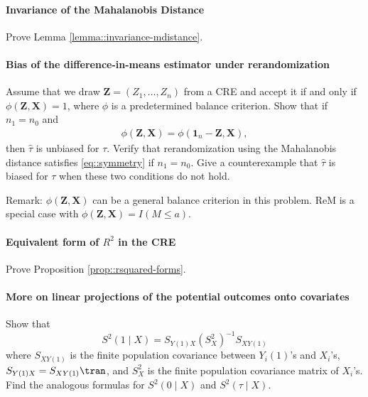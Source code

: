 \paragraph{Invariance of the Mahalanobis Distance}\label{para::invariance-M}

Prove Lemma \ref{lemma::invariance-mdistance}. 


\paragraph{Bias of the difference-in-means estimator under rerandomization}\label{hw::unbiasednessof-tauhat-rerandom}

Assume that we draw $\bm{Z} = (Z_1, \ldots, Z_n)$ from a CRE and accept it if and only if $\phi(\bm{Z}, \bm{X}) = 1$, where $\phi$ is a predetermined balance criterion. Show that if $n_1 = n_0$ and 
\begin{eqnarray}
\phi(\bm{Z}, \bm{X}) = \phi(\bm{1}_n-\bm{Z}, \bm{X}), \label{eq::symmetry}
\end{eqnarray}
then $\hat{\tau}$ is unbiased for $\tau$. 
Verify that rerandomization using the Mahalanobis distance satisfies \eqref{eq::symmetry} if $n_1 = n_0$. 
Give a counterexample that $\hat{\tau}$ is biased for $\tau$ when these two conditions do not hold.  


Remark: $\phi(\bm{Z}, \bm{X}) $ can be a general balance criterion in this problem. ReM is a special case with $\phi(\bm{Z}, \bm{X})  =  I(M\leq a) $.


\paragraph{Equivalent form of $R^2$ in the CRE}\label{para::r2-cre}

Prove Proposition \ref{prop::rsquared-forms}. 



\paragraph{More on linear projections of the potential outcomes onto covariates}\label{hw::projection-po-onto-x}



Show that
$$
S^2(1\mid X) = S_{Y(1)X} (S_X^2)^{-1} S_{XY(1)}
$$
where $S_{XY(1)}$ is the finite population covariance between $Y_i(1)$'s and $X_i$'s, $S_{Y(1)X} = S_{XY(1)}\tran$, and $S_X^2$ is the finite population covariance matrix of $X_i$'s. 
Find the analogous formulas for $S^2(0\mid X) $ and $S^2(\tau\mid X) .$



